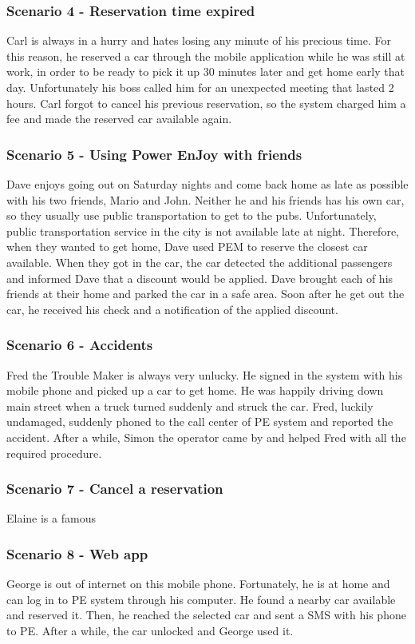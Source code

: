 \subsubsection{Scenario 4 - Reservation time expired}
Carl is always in a hurry and hates losing any minute of his precious time. For this reason, he reserved a car through the mobile application while he was still at work, in order to be ready to pick it up 30 minutes later and get home early that day. Unfortunately his boss called him for an unexpected meeting that lasted 2 hours. Carl forgot to cancel his previous reservation, so the system charged him a fee and made the reserved car available again.

\subsubsection{Scenario 5 - Using Power EnJoy with friends}
Dave enjoys going out on Saturday nights and come back home as late as possible with his two friends, Mario and John.  Neither he and his friends has his own car, so they usually use public transportation to get to the pubs. Unfortunately, public transportation service in the city is not available late at night. Therefore, when they wanted to get home, Dave used PEM to reserve the closest car available. When they got in the car, the car detected the additional passengers and informed Dave that a discount would be applied. Dave brought each of his friends at their home and parked the car in a safe area. Soon after he get out the car, he received his check and a notification of the applied discount.

\subsubsection{Scenario 6 - Accidents}
Fred the Trouble Maker is always very unlucky. He signed in the system with his mobile phone and picked up a car to get home. He was happily driving down main street when a truck turned suddenly and struck the car. Fred, luckily undamaged, suddenly phoned to the call center of PE system and reported the accident. After a while, Simon the operator came by and helped Fred with all the required procedure. 

\subsubsection{Scenario 7 - Cancel a reservation}
Elaine is a famous 

\subsubsection{Scenario 8 - Web app}
George is out of internet on this mobile phone. Fortunately, he is at home and can log in to PE system through his computer. He found a nearby car available and reserved it. Then, he reached the selected car and sent a SMS with his phone to PE. After a while, the car unlocked and George used it.


